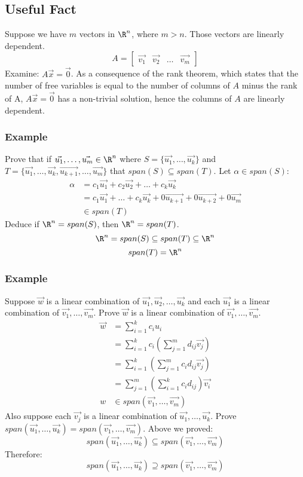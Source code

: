 \documentclass[letterpaper, 12pt]{math}
\begin{document}
\subsection*{Useful Fact}
Suppose we have \( m \) vectors in \( \R^n \), where \( m > n \). Those vectors
are linearly dependent.
\[ A = \begin{bmatrix}\vec{v_1} & \vec{v_2} & \dots & \vec{v_m}\end{bmatrix} \]
Examine: \( A\vec{x} = \vec{0} \). As a consequence of the rank theorem, which
states that the number of free variables is equal to the number of columns of
\( A \) minus the rank of A, \( A\vec{x} = \vec{0} \) has a non-trivial
solution, hence the columns of \( A \) are linearly dependent.

\subsubsection*{Example}
Prove that if \( \vec{u_1},\dots,\vec{u_m}\in\R^n \) where \( S = \{\vec{u_1},
\dots,\vec{u_k}\} \) and \( T = \{\vec{u_1},\dots,\vec{u_k},\vec{u_{k+1}},\dots,
\vec{u_m}\} \) that \( span(S)\subseteq span(T) \).
Let \( \alpha\in span(S) \):
\begin{align*}
  \alpha &= c_1\vec{u_1}+c_2\vec{u_2}+\dots+c_k\vec{u_k} \\
  &= c_1\vec{u_1}+\dots+c_k\vec{u_k}+0\vec{u_{k+1}}+0\vec{u_{k+2}}+0\vec{u_m} \\
  &\in span(T)
\end{align*}
Deduce if \( \R^n = span(S) \), then \( \R^n = span(T) \).
\[ \R^n = span(S) \subseteq span(T) \subseteq \R^n \]
\[ span(T) = \R^n \]

\subsubsection*{Example}
Suppose \( \vec{w} \) is a linear combination of \( \vec{u_1},\vec{u_2},\dots,
\vec{u_k} \) and each \( \vec{u_1} \) is a linear combination of \( \vec{v_1},
\dots,\vec{v_m} \). Prove \( \vec{w} \) is a linear combination of \( \vec{v_1},
\dots,\vec{v_m} \).
\begin{align*}
  \vec{w} &= \sum_{i=1}^{k}c_iu_i \\
  &= \sum_{i=1}^{k}c_i\left(\sum_{j=1}^{m}d_{ij}\vec{v_j}\right) \\
  &= \sum_{i=1}^{k}\left(\sum_{j=1}^{m}c_id_{ij}\vec{v_j}\right) \\
  &= \sum_{j=1}^{m}\left(\sum_{i=1}^{k}c_id_{ij}\right)\vec{v_i} \\
  w &\in span(\vec{v_1},\dots,\vec{v_m})
\end{align*}
Also suppose each \( \vec{v_j} \) is a linear combination of \( \vec{u_1},\dots,
\vec{u_k} \). Prove \( span(\vec{u_1},\dots,\vec{u_k}) =
span(\vec{v_1},\dots,\vec{v_m}) \). Above we proved:
\[ span(\vec{u_1},\dots,\vec{u_k}) \subseteq span(\vec{v_1},\dots,\vec{v_m}) \]
Therefore:
\[ span(\vec{u_1},\dots,\vec{u_k}) \supseteq span(\vec{v_1},\dots,\vec{v_m}) \]
\end{document}
